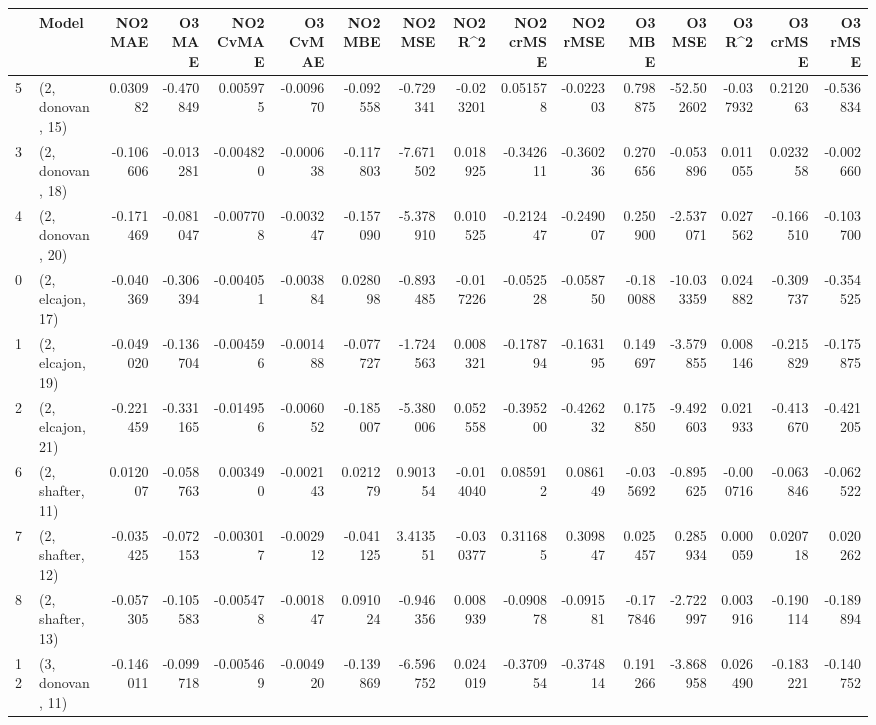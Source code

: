 \begin{tabular}{llrrrrrrrrrrrrrr}
\toprule
{} &             Model &   NO2 MAE &    O3 MAE &  NO2 CvMAE &  O3 CvMAE &   NO2 MBE &    NO2 MSE &   NO2 R\textasciicircum2 &  NO2 crMSE &  NO2 rMSE &    O3 MBE &     O3 MSE &    O3 R\textasciicircum2 &  O3 crMSE &   O3 rMSE \\
\midrule
5  &  (2, donovan, 15) &  0.030982 & -0.470849 &   0.005975 & -0.009670 & -0.092558 &  -0.729341 & -0.023201 &   0.051578 & -0.022303 &  0.798875 & -52.502602 & -0.037932 &  0.212063 & -0.536834 \\
3  &  (2, donovan, 18) & -0.106606 & -0.013281 &  -0.004820 & -0.000638 & -0.117803 &  -7.671502 &  0.018925 &  -0.342611 & -0.360236 &  0.270656 &  -0.053896 &  0.011055 &  0.023258 & -0.002660 \\
4  &  (2, donovan, 20) & -0.171469 & -0.081047 &  -0.007708 & -0.003247 & -0.157090 &  -5.378910 &  0.010525 &  -0.212447 & -0.249007 &  0.250900 &  -2.537071 &  0.027562 & -0.166510 & -0.103700 \\
0  &  (2, elcajon, 17) & -0.040369 & -0.306394 &  -0.004051 & -0.003884 &  0.028098 &  -0.893485 & -0.017226 &  -0.052528 & -0.058750 & -0.180088 & -10.033359 &  0.024882 & -0.309737 & -0.354525 \\
1  &  (2, elcajon, 19) & -0.049020 & -0.136704 &  -0.004596 & -0.001488 & -0.077727 &  -1.724563 &  0.008321 &  -0.178794 & -0.163195 &  0.149697 &  -3.579855 &  0.008146 & -0.215829 & -0.175875 \\
2  &  (2, elcajon, 21) & -0.221459 & -0.331165 &  -0.014956 & -0.006052 & -0.185007 &  -5.380006 &  0.052558 &  -0.395200 & -0.426232 &  0.175850 &  -9.492603 &  0.021933 & -0.413670 & -0.421205 \\
6  &  (2, shafter, 11) &  0.012007 & -0.058763 &   0.003490 & -0.002143 &  0.021279 &   0.901354 & -0.014040 &   0.085912 &  0.086149 & -0.035692 &  -0.895625 & -0.000716 & -0.063846 & -0.062522 \\
7  &  (2, shafter, 12) & -0.035425 & -0.072153 &  -0.003017 & -0.002912 & -0.041125 &   3.413551 & -0.030377 &   0.311685 &  0.309847 &  0.025457 &   0.285934 &  0.000059 &  0.020718 &  0.020262 \\
8  &  (2, shafter, 13) & -0.057305 & -0.105583 &  -0.005478 & -0.001847 &  0.091024 &  -0.946356 &  0.008939 &  -0.090878 & -0.091581 & -0.177846 &  -2.722997 &  0.003916 & -0.190114 & -0.189894 \\
12 &  (3, donovan, 11) & -0.146011 & -0.099718 &  -0.005469 & -0.004920 & -0.139869 &  -6.596752 &  0.024019 &  -0.370954 & -0.374814 &  0.191266 &  -3.868958 &  0.026490 & -0.183221 & -0.140752 \\

\end{tabular}

